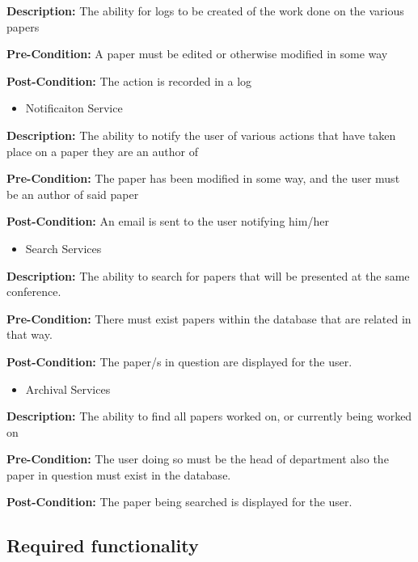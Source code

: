 \documentclass[11pt]{article}
\begin{document}
{\raggedright
	\textbf{Description: }The ability for logs to be created of the work done on the various papers
}

{\raggedright
	\textbf{Pre-Condition: }A paper must be edited or otherwise modified in some way
}

{\raggedright
	\textbf{Post-Condition: }The action is recorded in a log
}

\begin{itemize}
	\item Notificaiton Service
\end{itemize}

{\raggedright
	\textbf{Description: }The ability to notify the user of various actions that have taken place on a paper they are an author of
}

{\raggedright
	\textbf{Pre-Condition: }The paper has been modified in some way, and the user must be an author of said paper
}

{\raggedright
	\textbf{Post-Condition: }An email is sent to the user notifying him/her
}

\begin{itemize}
	\item Search Services
\end{itemize}

{\raggedright
	\textbf{Description: }The ability to search for papers that will be presented at the same conference.
}

{\raggedright
	\textbf{Pre-Condition: }There must exist papers within the database that are related in that way.
}

{\raggedright
	\textbf{Post-Condition: }The paper/s in question are displayed for the user.
}

\begin{itemize}
	\item Archival Services
\end{itemize}

{\raggedright
	\textbf{Description: }The ability to find all papers worked on, or currently being worked on
}

{\raggedright
	\textbf{Pre-Condition: }The user doing so must be the head of department also the paper in question must exist in the database.
}

{\raggedright
	\textbf{Post-Condition: }The paper being searched is displayed for the user.
}

\subsection{Required functionality}
\end{document}
